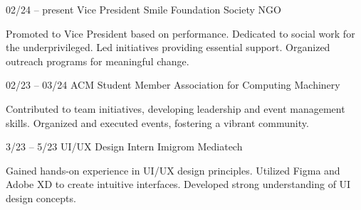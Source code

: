 \documentclass[9pt]{developercv} %
\begin{document}
\vspace{-20 pt}
\begin{entrylist}
	\entry
        {02/24 -- present}
		{Vice President}
		{Smile Foundation Society NGO}
		{\vspace{-10pt}
        \begin{itemize}[noitemsep,topsep=0pt,parsep=0pt,partopsep=0pt, leftmargin=-1pt]
            Promoted to Vice President based on performance. Dedicated to social work for the underprivileged.
Led initiatives providing essential support. Organized outreach programs for meaningful change.

        \end{itemize} 
 }
	\entry
		{02/23 -- 03/24}
		{ACM Student Member}
		{Association for Computing Machinery}
		{\vspace{-10pt}
        \begin{itemize}[noitemsep,topsep=0pt,parsep=0pt,partopsep=0pt, leftmargin=-1pt]
           Contributed to team initiatives, developing leadership and event management skills. Organized and
executed events, fostering a vibrant community.

        \end{itemize} 
       }
	\entry
		{3/23 -- 5/23 }
		{UI/UX Design Intern}
		{Imigrom Mediatech}
		{\vspace{-10pt}
        \begin{itemize}[noitemsep,topsep=0pt,parsep=0pt,partopsep=0pt, leftmargin=-1pt]
          Gained hands-on experience in UI/UX design principles. Utilized Figma and Adobe XD to create
intuitive interfaces. Developed strong understanding of UI design concepts.

        \end{itemize} 
      }
\end{entrylist}
\end{document}

